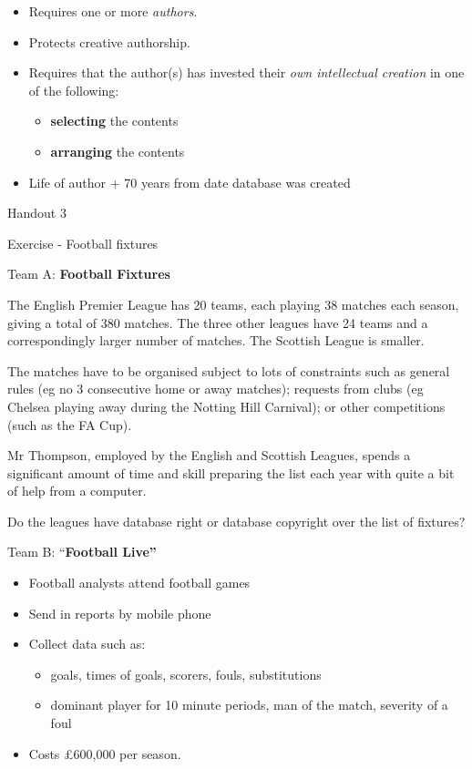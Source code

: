 \begin{itemize}
\item
  Requires one or more \emph{authors}.
\item
  Protects creative authorship.
\item
  Requires that the author(s) has invested their \emph{own intellectual
  creation} in one of the following:

  \begin{itemize}
  \item
    \textbf{selecting} the contents
  \item
    \textbf{arranging} the contents
  \end{itemize}
\item
  Life of author + 70 years from date database was created
\end{itemize}

Handout 3

Exercise - Football fixtures

Team A: \textbf{Football Fixtures}

The English Premier League has 20 teams, each playing 38 matches each
season, giving a total of 380 matches. The three other leagues have 24
teams and a correspondingly larger number of matches. The Scottish
League is smaller.

The matches have to be organised subject to lots of constraints such as
general rules (eg no 3 consecutive home or away matches); requests from
clubs (eg Chelsea playing away during the Notting Hill Carnival); or
other competitions (such as the FA Cup).

Mr Thompson, employed by the English and Scottish Leagues, spends a
significant amount of time and skill preparing the list each year with
quite a bit of help from a computer.

Do the leagues have database right or database copyright over the list
of fixtures?

Team B: ``\textbf{Football Live''}

\begin{itemize}
\item
  Football analysts attend football games
\item
  Send in reports by mobile phone
\item
  Collect data such as:

  \begin{itemize}
  \item
    goals, times of goals, scorers, fouls, substitutions
  \item
    dominant player for 10 minute periods, man of the match, severity of
    a foul
  \end{itemize}
\item
  Costs £600,000 per season.
\end{itemize}

